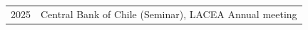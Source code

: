 \begin{longtable}[l]{@{}p{} p{}}

2025 & Central Bank of Chile (Seminar), LACEA Annual meeting
\end{longtable}